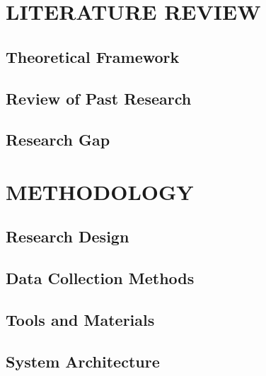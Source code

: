 \chapter{LITERATURE REVIEW}

\section{Theoretical Framework}

\section{Review of Past Research}

\section{Research Gap}


\chapter{METHODOLOGY}

\section{Research Design}

\section{Data Collection Methods}

\section{Tools and Materials}

\section{System Architecture}

